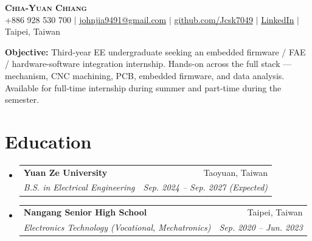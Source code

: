 \documentclass[letterpaper,11pt]{article}
\makeatletter
\newcommand{\resumeSubheading}[4]{
  \vspace{-2pt}\item
    \begin{tabular*}{0.97\textwidth}[t]{l@{\extracolsep{\fill}}r}
      \textbf{#1} & #2 \\
      \textit{\small#3} & \textit{\small #4} \\
    \end{tabular*}\vspace{-7pt}
}
\newcommand{\resumeSubHeadingListStart}{\begin{itemize}[leftmargin=0.0in, label={}]}
\newcommand{\resumeSubHeadingListEnd}{\end{itemize}}
\makeatother
\begin{document}
\begin{center}
    \textbf{\Huge \scshape Chia-Yuan Chiang} \\ \vspace{1pt}
    \small +886 928 530 700 $|$ \href{mailto:johnjia9491@gmail.com}{johnjia9491@gmail.com} $|$
    \href{https://github.com/Jcsk7049}{github.com/Jcsk7049} $|$
    \href{https://linkedin.com/in/\%E5\%98\%89\%E5\%85\%83-\%E6\%B1\%9F-662764344}{LinkedIn} $|$
    Taipei, Taiwan
\end{center}

\vspace{-4pt}
\small{\textbf{Objective:} Third-year EE undergraduate seeking an embedded firmware / FAE / hardware-software integration internship. Hands-on across the full stack --- mechanism, CNC machining, PCB, embedded firmware, and data analysis. Available for full-time internship during summer and part-time during the semester.}
\vspace{2pt}

\section{Education}
  \resumeSubHeadingListStart
    \resumeSubheading
      {Yuan Ze University}{Taoyuan, Taiwan}
      {B.S. in Electrical Engineering}{Sep. 2024 -- Sep. 2027 (Expected)}
    \resumeSubheading
      {Nangang Senior High School}{Taipei, Taiwan}
      {Electronics Technology (Vocational, Mechatronics)}{Sep. 2020 -- Jun. 2023}
  \resumeSubHeadingListEnd

\end{document}
